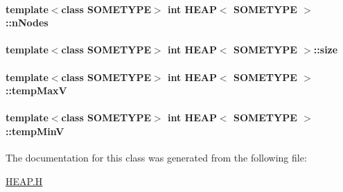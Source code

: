 \hypertarget{classHEAP_ad481b16366a0a0ff65418afc71d9e652}{
\paragraph[{n\+Nodes}]{\setlength{\rightskip}{0pt plus 5cm}template$<$class S\+O\+M\+E\+T\+Y\+P\+E$>$ int {\bf H\+E\+A\+P}$<$ S\+O\+M\+E\+T\+Y\+P\+E $>$\+::n\+Nodes}}\label{classHEAP_ad481b16366a0a0ff65418afc71d9e652}
\hypertarget{classHEAP_a660f8fd84a9646a631badb8c6ca87aca}{
\paragraph[{size}]{\setlength{\rightskip}{0pt plus 5cm}template$<$class S\+O\+M\+E\+T\+Y\+P\+E$>$ int {\bf H\+E\+A\+P}$<$ S\+O\+M\+E\+T\+Y\+P\+E $>$\+::size}}\label{classHEAP_a660f8fd84a9646a631badb8c6ca87aca}
\hypertarget{classHEAP_a82daf731595f82a6224fc9360b63a58d}{
\paragraph[{temp\+Max\+V}]{\setlength{\rightskip}{0pt plus 5cm}template$<$class S\+O\+M\+E\+T\+Y\+P\+E$>$ int {\bf H\+E\+A\+P}$<$ S\+O\+M\+E\+T\+Y\+P\+E $>$\+::temp\+Max\+V}}\label{classHEAP_a82daf731595f82a6224fc9360b63a58d}
\hypertarget{classHEAP_a0402f157889d6b40f219c608bc9a3503}{
\paragraph[{temp\+Min\+V}]{\setlength{\rightskip}{0pt plus 5cm}template$<$class S\+O\+M\+E\+T\+Y\+P\+E$>$ int {\bf H\+E\+A\+P}$<$ S\+O\+M\+E\+T\+Y\+P\+E $>$\+::temp\+Min\+V}}\label{classHEAP_a0402f157889d6b40f219c608bc9a3503}


The documentation for this class was generated from the following file\+:\begin{DoxyCompactItemize}
\item 
\hyperlink{HEAP_8H}{H\+E\+A\+P.\+H}\end{DoxyCompactItemize}
